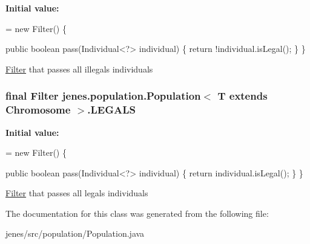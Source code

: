 {\bfseries Initial value\-:}
\begin{DoxyCode}
= \textcolor{keyword}{new} Filter() \{

        \textcolor{keyword}{public} \textcolor{keywordtype}{boolean} pass(Individual<?> individual) \{
            \textcolor{keywordflow}{return} !individual.isLegal();
        \}
    \}
\end{DoxyCode}
\hyperlink{interfacejenes_1_1population_1_1_population_3_01_t_01extends_01_chromosome_01_4_1_1_filter}{Filter} that passes all illegals individuals \hypertarget{classjenes_1_1population_1_1_population_3_01_t_01extends_01_chromosome_01_4_a99a629869951da716c9efc8be2fdbb70}{
\subsubsection[{L\-E\-G\-A\-L\-S}]{\setlength{\rightskip}{0pt plus 5cm}final Filter jenes.\-population.\-Population$<$ T extends Chromosome $>$.L\-E\-G\-A\-L\-S\hspace{0.3cm}{\ttfamily [static]}}}\label{classjenes_1_1population_1_1_population_3_01_t_01extends_01_chromosome_01_4_a99a629869951da716c9efc8be2fdbb70}
{\bfseries Initial value\-:}
\begin{DoxyCode}
= \textcolor{keyword}{new} Filter() \{

        \textcolor{keyword}{public} \textcolor{keywordtype}{boolean} pass(Individual<?> individual) \{
            \textcolor{keywordflow}{return} individual.isLegal();
        \}
    \}
\end{DoxyCode}
\hyperlink{interfacejenes_1_1population_1_1_population_3_01_t_01extends_01_chromosome_01_4_1_1_filter}{Filter} that passes all legals individuals 

The documentation for this class was generated from the following file\-:\begin{DoxyCompactItemize}
\item 
jenes/src/population/Population.\-java\end{DoxyCompactItemize}
